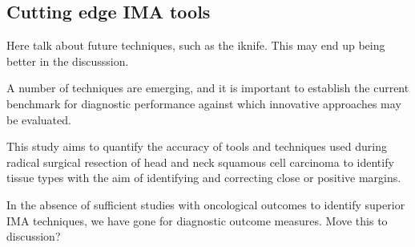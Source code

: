 \subsection{Cutting edge IMA tools}

Here talk about future techniques, such as the iknife. 
This may end up being better in the discusssion.

A number of techniques are emerging, and it is important to establish the current benchmark for diagnostic performance against which innovative approaches may be evaluated.

This study aims to quantify the accuracy of tools and techniques used during radical surgical resection of head and neck squamous cell carcinoma to identify tissue types with the aim of identifying and correcting close or positive margins.

In the absence of sufficient studies with oncological outcomes to identify superior IMA techniques, we have gone for diagnostic outcome measures. Move this to discussion?
